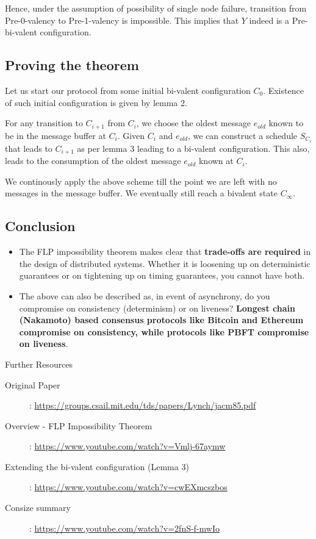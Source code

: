 Hence, under the assumption of possibility of single node failure, transition from Pre-0-valency to Pre-1-valency is impossible. This implies that $Y$ indeed is a Pre-bi-valent configuration.

\subsection{Proving the theorem}
Let us start our protocol from some initial bi-valent configuration $C_0$. Existence of such initial configuration is given by lemma 2.

For any transition to $C_{i+1}$ from $C_{i}$, we choose the oldest message $e_{old}$ known to be in the message buffer at $C_i$. Given $C_i$ and $e_{old}$, we can construct a schedule $S_{C_i}$ that leads to $C_{i+1}$ as per lemma 3 leading to a bi-valent configuration. This also, leads to the consumption of the oldest message $e_{old}$ known at $C_i$.

We continously apply the above scheme till the point we are left with no messages in the message buffer. We eventually still reach a bivalent state $C_{\infty}$.

\subsection{Conclusion}
\begin{itemize}
    \item The FLP impossibility theorem makes clear that \textbf{trade-offs are required} in the design of distributed systems. Whether it is loosening up on deterministic guarantees or on tightening up on timing guarantees, you cannot have both.
    \item The above can also be described as, in event of asynchrony, do you compromise on consistency (determinism) or on liveness? \textbf{Longest chain (Nakamoto) based consensus protocols like Bitcoin and Ethereum compromise on consistency, while protocols like PBFT compromise on liveness}.
\end{itemize}

\begin{refbox}{Further Resources}
    \small
    \begin{description}
        \item [Original Paper]: \href{https://groups.csail.mit.edu/tds/papers/Lynch/jacm85.pdf}{https://groups.csail.mit.edu/tds/papers/Lynch/jacm85.pdf}
        \item [Overview - FLP Impossibility Theorem]: \href{https://www.youtube.com/watch?v=Vmlj-67aymw}{https://www.youtube.com/watch?v=Vmlj-67aymw}
        \item [Extending the bi-valent configuration (Lemma 3)]: \href{https://www.youtube.com/watch?v=cwEXmcszbos}{https://www.youtube.com/watch?v=cwEXmcszbos}
        \item [Consize summary]: \href{https://www.youtube.com/watch?v=2fnS-f-mwIo}{https://www.youtube.com/watch?v=2fnS-f-mwIo}
    \end{description}
\end{refbox}